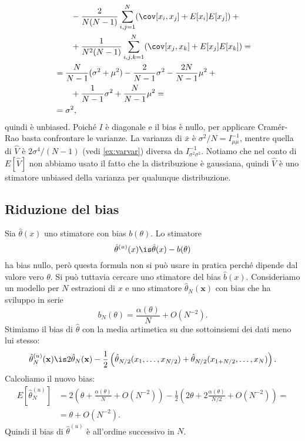 \begin{solution}
\begin{align*}
        &\qquad - \frac2{N(N-1)} \sum_{i,j=1}^N (\cov[x_i, x_j] + E[x_i]E[x_j]) + {} \\
        &\qquad + \frac1{N^2(N-1)} \sum_{i,j,k=1}^N (\cov[x_j, x_k] + E[x_j]E[x_k]) = \\
        &= \frac N{N-1} (\sigma^2 + \mu^2)
        - \frac2{N-1} \sigma^2 - \frac{2N}{N-1} \mu^2 + {} \\
        &\qquad + \frac1{N-1} \sigma^2 + \frac N{N-1} \mu^2 = \\
        &= \sigma^2,
    \end{align*}
    quindi è unbiased. Poiché $I$ è diagonale e il bias è nullo, per applicare
    Cramér-Rao basta confrontare le varianze. La varianza di $\bar x$ è
    $\sigma^2/N = I_{\mu\mu}^{-1}$, mentre quella di $\hat V$ è
    $2\sigma^4/(N-1)$ (vedi \autoref{ex:varvar}) diversa da
    $I_{\sigma^2\sigma^2}^{-1}$.
    Notiamo che nel conto di $E[\hat V]$ non abbiamo usato il fatto che la
    distribuzione è gaussiana, quindi $\hat V$ è uno stimatore unbiased della
    varianza per qualunque distribuzione.
\end{solution}

\subsection{Riduzione del bias}

Sia $\hat\theta(x)$ uno stimatore con bias $b(\theta)$.
Lo stimatore
\begin{equation*}
	\hat\theta^{(u)}(x)
	\is \hat\theta(x) - b(\theta)
\end{equation*}
ha bias nullo,
però questa formula non si può usare in pratica perché dipende dal valore vero $\theta$.
Si può tuttavia cercare uno stimatore del bias $\hat b(x)$.
Consideriamo un modello per $N$ estrazioni di $x$
e uno stimatore $\hat\theta_N(\mathbf x)$
con bias che ha sviluppo in serie
\begin{equation*}
	b_N(\theta)
	= \frac{\alpha(\theta)}N + O(N^{-2}).
\end{equation*}
Stimiamo il bias di $\hat\theta$ con la media artimetica su due sottoinsiemi dei dati meno lui stesso:
\begin{equation*}
	\hat\theta^{(u)}_N(\mathbf x)
	\is 2\hat\theta_N(\mathbf x)
	- \frac12 \left( \hat\theta_{N/2}(x_1,\dots,x_{N/2}) + \hat\theta_{N/2}(x_{1+N/2},\dots,x_N) \right).
\end{equation*}
Calcoliamo il nuovo bias:
\begin{align*}
	E[\hat\theta^{(u)}_N]
	&= 2 \left( \theta + \frac{\alpha(\theta)}N + O(N^{-2}) \right)
	- \frac12 \left( 2\theta + 2 \frac{\alpha(\theta)}{N/2} + O(N^{-2}) \right) = \\
	&= \theta + O(N^{-2}).
\end{align*}
Quindi il bias di $\hat\theta^{(u)}$ è all'ordine successivo in $N$.

